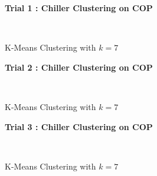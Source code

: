 \begin{figure}[!h]
\centerline{\bfseries\Large Trial 1 : Chiller Clustering on COP}\\
\caption{K-Means Clustering with $k=7$}
\end{figure}
\begin{figure}[!h]
\centerline{\bfseries\Large Trial 2 : Chiller Clustering on COP}\\
\caption{K-Means Clustering with $k=7$}
\end{figure}
\begin{figure}[!h]
\centerline{\bfseries\Large Trial 3 : Chiller Clustering on COP}\\
\caption{K-Means Clustering with $k=7$}
\end{figure}
